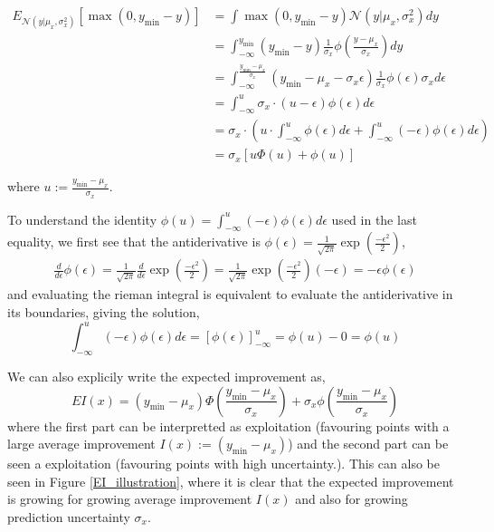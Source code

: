 \begin{align*}
    E_{\mathcal{N}(y|\mu_x, \sigma_x^2)}[\max(0,y_{\min}-y)] &= \int \max(0,y_{\min}-y) \mathcal{N}(y|\mu_x, \sigma_x^2) dy\\
    &= \int_{-\infty}^{y_{\min}} (y_{\min}-y) \frac{1}{\sigma_x}\phi\left(\frac{y-\mu_x}{\sigma_x}\right) dy\\
    &= \int_{-\infty}^{\frac{y_{\min}-\mu_x}{\sigma_x}} (y_{\min}-\mu_x-\sigma_x\epsilon) \frac{1}{\sigma_x}\phi\left(\epsilon\right) \sigma_x d\epsilon\\
    &= \int_{-\infty}^u \sigma_x \cdot (u-\epsilon) \phi(\epsilon) d\epsilon\\
    &=  \sigma_x \cdot \left( u\cdot \int_{-\infty}^u \phi(\epsilon) d\epsilon +\int_{-\infty}^u (-\epsilon)  \phi(\epsilon) d\epsilon \right) \\
    &= \sigma_x [u\Phi(u)+ \phi(u)]
\end{align*}

where $u:=\frac{y_{\min}-\mu_x}{\sigma_x}$. 

\begin{note2}
    To understand the identity $\phi(u) = \int_{-\infty}^u
    (-\epsilon)  \phi(\epsilon) d\epsilon$ used in the last equality, we first see that the antiderivative
is $\phi(\epsilon) = \frac{1}{\sqrt{2\pi}} \exp\left(\frac{-\epsilon^2}{2}\right)$,
\begin{align*}
    \frac{d}{d \epsilon} \phi(\epsilon) =  \frac{1}{\sqrt{2\pi}}\frac{d}{d \epsilon}  \exp\left(\frac{-\epsilon^2}{2}\right) 
    =  \frac{1}{\sqrt{2\pi}}\exp\left(\frac{-\epsilon^2}{2}\right)(-\epsilon)
    = -\epsilon \phi(\epsilon)
\end{align*}
and evaluating the rieman integral is equivalent to evaluate the antiderivative in its boundaries, giving the 
solution, 
$$\int_{-\infty}^u
(-\epsilon)  \phi(\epsilon) d\epsilon = \left[\phi(\epsilon)\right]_{-\infty}^u = \phi(u)-0 = \phi(u)$$ 
\end{note2}

We can also explicily write the expected improvement as, 
$$EI(x) = (y_{\min}-\mu_x)\Phi\left(\frac{y_{\min}-\mu_x}{\sigma_x}\right)+ \sigma_x
\phi\left(\frac{y_{\min}-\mu_x}{\sigma_x}\right)$$ where the first part can be interpretted as
exploitation (favouring points with a large average improvement $I(x) := (y_{\min}-\mu_x)$) and the second
part can be seen a exploitation (favouring points with high uncertainty.). This can also be seen
in Figure \eqref{EI_illustration}, where it is clear that the expected improvement is growing for
growing average improvement $I(x)$ and also for growing prediction uncertainty $\sigma_x$.


